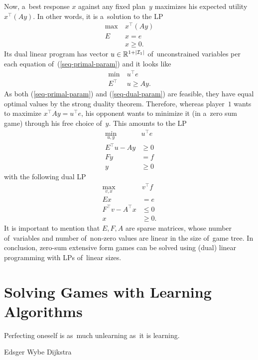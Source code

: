 Now, a~best response $x$ against any fixed plan~$y$ maximizes his expected utility $x ^\top (Ay)$.
In other words, it is a~solution to the LP
\begin{equation}
\label{seq-primal-param}
\begin{split}
    \max\  &x^\top (Ay) \\
    E&x = e \\
    &x \ge 0.
\end{split}
\end{equation}
Its dual linear program has vector $u \in \mathbb{R}^{1 + \left\vert \mathcal{I}_1 \right\vert}$ of~unconstrained variables per each equation of~(\ref{seq-primal-param}) and it looks like
\begin{equation}
\label{seq-dual-param}
\begin{split}
    \min\  &u^\top e \\
    E^\top &u \ge Ay.
\end{split}
\end{equation}
As both (\ref{seq-primal-param}) and (\ref{seq-dual-param}) are feasible, they have equal optimal values by the strong duality theorem.
Therefore, whereas player~$1$ wants to maximize $x^\top Ay = u^\top e$, his opponent wants to minimize it (in a~zero sum game) through his free choice of~$y$.
This amounts to the LP
\begin{equation}
\label{seq-dual}
\begin{split}
    \min_{u, y}\  &u^\top e \\
    E^\top u - Ay &\ge 0 \\
    Fy &= f \\
    y &\ge 0
\end{split}
\end{equation}
with the following dual LP
\begin{equation}
\label{seq-primal}
\begin{split}
    \max_{v, x}\  &v^\top f \\
    Ex &= e \\
    F^\top v - A^\top x &\le 0 \\
    x &\ge 0.
\end{split}
\end{equation}
It is important to mention that $E, F, A$ are sparse matrices, whose number of~variables and number of~non-zero values are linear in the size of~game tree.
In conclusion, zero-sum extensive form games can be solved using (dual) linear programming with LPs of~linear sizes.

\section{Solving Games with Learning Algorithms}
{
  \setlength{\epigraphwidth}{0.65\textwidth}
  \epigraph{
    Perfecting oneself is as~much unlearning as~it is learning.
  }{Edsger Wybe Dijkstra}
}%
\todo

